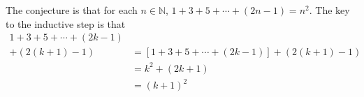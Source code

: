 \begin{list}{\bf{\ref{exer:sec51-3}.}}
\begin{list}{\bf{(a)}}
%
%
\end{list}
\end{list}

\begin{list}{\bf{\ref{exer:sec51-5}.}}
\item The conjecture is that  for each  $n \in \mathbb{N}$,  $1 + 3 + 5 + \cdots + (2n - 1) = n^2$.
The key to the inductive step is that
\begin{align*}
 1 + 3 + 5 + \cdots + (2k - 1) & \\
+ (2(k+1) - 1)  &= \left[1 + 3 + 5 + \cdots + (2k - 1) \right] + (2(k+1) - 1)\\ 
   &= k^2 + (2k + 1) \\
   &= (k + 1)^2 
\end{align*}
\end{list}

